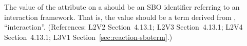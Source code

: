 The value of the  attribute on a \Reaction should
be an SBO identifier referring to an interaction framework.  That
is, the value should be a term derived from \sbointeractionID,
``interaction''.  (References: L2V2 Section~4.13.1; L2V3
Section~4.13.1; L2V4 Section~4.13.1; L3V1 Section~\ref{sec:reaction-sboterm}.)
